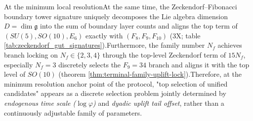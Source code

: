 \begin{enumerate}
\begin{corollary}   \label{cor:terminal-rotation-window-prototype}
In the one-dimensional prototype, the readout of torus rotation  \end{corollary}

\item }  \end{enumerate}

\begin{theorem}\label{thm:terminal-6d-microstate-golden-time-gut-branch}
At the minimum local resolutionAt the same time, the Zeckendorf--Fibonacci boundary tower signature uniquely decomposes the Lie algebra dimension \(D=\dim\mathfrak g\) into the sum of boundary layer counts and aligns the top term of \((SU(5),SO(10),E_6)\) exactly with \((F_8,F_9,F_{10})\) (\SXPH3X; table \ref{tab:zeckendorf_gut_signatures}).Furthermore, the family number \(N_f\) achieves branch locking on \(N_f\in\{2,3,4\}\) through the top-level Zeckendorf term of \(15N_f\), especially \(N_f=3\) discretely selects the \(F_9=34\) branch and aligns it with the top level of \(SO(10)\) (theorem \ref{thm:terminal-family-uplift-lock}).Therefore, at the minimum resolution anchor point of the protocol, "top selection of unified candidates" appears as a discrete selection problem jointly determined by \emph {endogenous time scale (\(\log\varphi\))} and \emph {dyadic uplift tail offset}, rather than a continuously adjustable family of parameters.\end{theorem}

